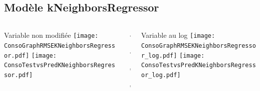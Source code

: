 \documentclass[8pt,aspectratio=169,hyperref={unicode=true}]{beamer}
\begin{document}
\subsection{Modèle kNeighborsRegressor}
\begin{frame}{\insertsubsection}
  \begin{columns}[t]
    \begin{column}{.31\textwidth}
      \centering Variable non modifiée
      \texttt{[image: ConsoGraphRMSEKNeighborsRegressor.pdf]}
      \texttt{[image: ConsoTestvsPredKNeighborsRegressor.pdf]}
    \end{column}
    \begin{column}{.38\textwidth}
      $\Longleftarrow$
      \scriptsize
      {\centering
        }
      

      \normalsize
      $\Longleftarrow$

      \raggedleft $\Longrightarrow$
      \scriptsize
      {\centering
        }
      

      \normalsize
      $\Longrightarrow$
    \end{column}
    \begin{column}{.31\textwidth}
      \centering Variable au log
      \texttt{[image: ConsoGraphRMSEKNeighborsRegressor\_log.pdf]}
      \texttt{[image: ConsoTestvsPredKNeighborsRegressor\_log.pdf]}
    \end{column}
  \end{columns}
\end{frame}
\end{document}
